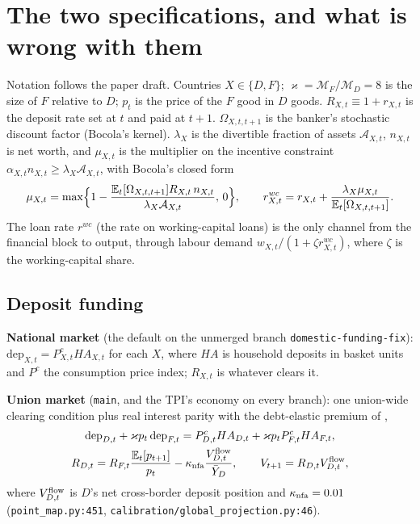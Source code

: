 \documentclass[11pt]{article}
\newcommand{\E}{\mathbb{E}}
\newcommand{\A}{\mathcal{A}}
\newcommand{\code}[1]{\texttt{\small #1}}
\begin{document}
\section{The two specifications, and what is wrong with them}
\label{sec:diag}

Notation follows the paper draft. Countries $X\in\{D,F\}$; $\varkappa=\mathcal M_F/\mathcal M_D=8$
is the size of $F$ relative to $D$; $p_t$ is the price of the $F$ good in $D$ goods.
$R_{X,t}\equiv1+r_{X,t}$ is the deposit rate set at $t$ and paid at $t+1$. $\Omega_{X,t,t+1}$ is
the banker's stochastic discount factor (Bocola's kernel). $\lambda_X$ is the divertible fraction
of assets $\A_{X,t}$, $n_{X,t}$ is net worth, and $\mu_{X,t}$ is the multiplier on the incentive
constraint $\alpha_{X,t}n_{X,t}\ge\lambda_X\A_{X,t}$, with Bocola's closed form
\begin{equation}
\mu_{X,t}=\max\Bigl\{1-\frac{\E_t[\Omega_{X,t,t+1}]R_{X,t}\,n_{X,t}}{\lambda_X\A_{X,t}},\,0\Bigr\},
\qquad
r^{wc}_{X,t}=r_{X,t}+\frac{\lambda_X\mu_{X,t}}{\E_t[\Omega_{X,t,t+1}]}.
\label{eq:mu}
\end{equation}
The loan rate $r^{wc}$ (the rate on working-capital loans) is the only channel from the financial
block to output, through labour demand $w_{X,t}/(1+\zeta r^{wc}_{X,t})$, where $\zeta$ is the
working-capital share.

\subsection{Deposit funding}

\textbf{National market} (the default on the unmerged branch \code{domestic-funding-fix}):
$\mathrm{dep}_{X,t}=P^c_{X,t}HA_{X,t}$ for each $X$, where $HA$ is household deposits in basket
units and $P^c$ the consumption price index; $R_{X,t}$ is whatever clears it.

\textbf{Union market} (\code{main}, and the TPI's economy on every branch): one union-wide
clearing condition plus real interest parity with the debt-elastic premium of
\citet{schmittgrohe2003closing},
\begin{gather}
\mathrm{dep}_{D,t}+\varkappa p_t\,\mathrm{dep}_{F,t}=P^c_{D,t}HA_{D,t}+\varkappa p_tP^c_{F,t}HA_{F,t},
\label{eq:union-clear}\\
R_{D,t}=R_{F,t}\frac{\E_t[p_{t+1}]}{p_t}-\kappa_{\rm nfa}\frac{V^{\rm flow}_{D,t}}{\bar Y_D},
\qquad V_{t+1}=R_{D,t}V^{\rm flow}_{D,t},
\label{eq:uip}
\end{gather}
where $V^{\rm flow}_{D,t}$ is $D$'s net cross-border deposit position and $\kappa_{\rm nfa}=0.01$
(\code{point\_map.py:451}, \code{calibration/global\_projection.py:46}).
\end{document}
